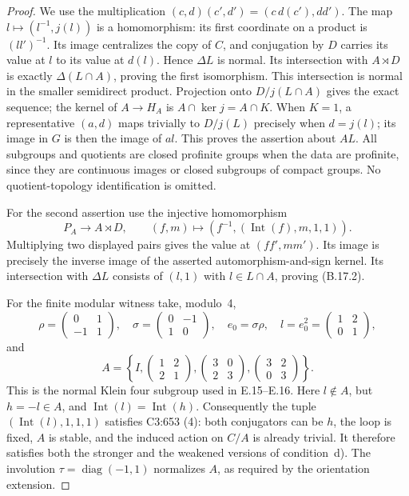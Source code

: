 \begin{proof}
We use the multiplication
\((c,d)(c',d')=(c\,d(c'),dd')\).
The map \(l\mapsto(l^{-1},j(l))\) is a homomorphism:
its first coordinate on a product is \((ll')^{-1}\).
Its image centralizes the copy of \(C\), and conjugation
by \(D\) carries its value at \(l\) to its value at
\(d(l)\).  Hence \(\Delta L\) is normal.
Its intersection with \(A\rtimes D\) is exactly
\(\Delta(L\cap A)\), proving the first isomorphism.
This intersection is normal in the smaller semidirect product.
Projection onto \(D/j(L\cap A)\) gives the exact sequence;
the kernel of \(A\to H_A\) is \(A\cap\ker j=A\cap K\).
When \(K=1\), a representative \((a,d)\) maps trivially
to \(D/j(L)\) precisely when \(d=j(l)\); its image in
\(G\) is then the image of \(al\).  This proves the
assertion about \(AL\).  All subgroups and quotients are
closed profinite groups when the data are profinite, since
they are continuous images or closed subgroups of compact
groups.  No quotient-topology identification is omitted.

For the second assertion use the injective homomorphism
\[
 P_A\longrightarrow A\rtimes D,
 \qquad(f,m)\longmapsto
 (f^{-1},(\operatorname{Int}(f),m,1,1)).
\]
Multiplying two displayed pairs gives the value at
\((ff',mm')\).  Its image is precisely the inverse image
of the asserted automorphism-and-sign kernel.  Its
intersection with \(\Delta L\) consists of
\((l,1)\) with \(l\in L\cap A\), proving (B.17.2).

For the finite modular witness take, modulo~4,
\[
 \rho=\begin{pmatrix}0&1\\-1&1\end{pmatrix},\quad
 \sigma=\begin{pmatrix}0&-1\\1&0\end{pmatrix},\quad
 e_0=\sigma\rho,\quad l=e_0^2=
 \begin{pmatrix}1&2\\0&1\end{pmatrix},
\]
and
\[
 A=\left\{I,
 \begin{pmatrix}1&2\\2&1\end{pmatrix},
 \begin{pmatrix}3&0\\2&3\end{pmatrix},
 \begin{pmatrix}3&2\\0&3\end{pmatrix}\right\}.
\]
This is the normal Klein four subgroup used in E.15--E.16.
Here \(l\notin A\), but \(h=-l\in A\), and
\(\operatorname{Int}(l)=\operatorname{Int}(h)\).
Consequently the tuple \((\operatorname{Int}(l),1,1,1)\)
satisfies C3:653 (4): both conjugators can be \(h\), the
loop is fixed, \(A\) is stable, and the induced action
on \(C/A\) is already trivial.  It therefore satisfies
both the stronger and the weakened versions of condition~d).
The involution \(\tau=\operatorname{diag}(-1,1)\)
normalizes \(A\), as required by the orientation extension.


\end{proof}
